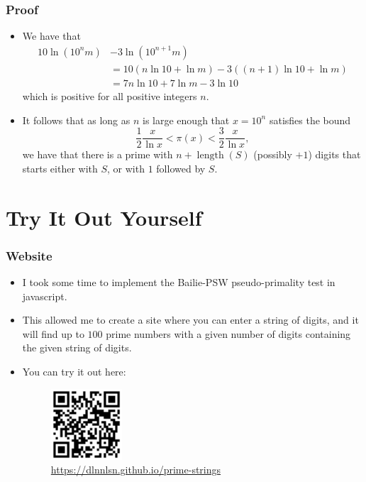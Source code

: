 \documentclass{beamer}
\begin{document}
\begin{frame}
    \frametitle{Proof}

    \begin{itemize}
        \item We have that
        \begin{align*}
            10 \ln\left( 10^n m \right) & - 3 \ln\left( 10^{n + 1} m \right) \\
            & = 10\left( n \ln 10 + \ln m \right) - 3\left( (n + 1) \ln 10  + \ln m \right) \\
            & = 7n \ln 10 + 7 \ln m - 3 \ln 10
        \end{align*}
        which is positive for all positive integers $n$. \pause
        \item It follows that as long as $n$ is large enough that $x = 10^n$ satisfies the bound
        \[
            \frac{1}{2} \frac{x}{\ln x} < \pi(x) < \frac{3}{2} \frac{x}{\ln x},
        \]
        we have that there is a prime with $n + \operatorname{length}(S)$ (possibly $+ 1$) digits that starts either with $S$, or with $1$ followed by $S$.
    \end{itemize} 

\end{frame}

\section{Try It Out Yourself}

\begin{frame}
    \frametitle{Website}

    \begin{itemize}
        \item I took some time to implement the Bailie-PSW pseudo-primality test in javascript. \pause
        \item This allowed me to create a site where you can enter a string of digits, and it will find up to $100$ prime numbers with a given number of digits containing the given string of digits. \pause
        \item You can try it out here:
        \begin{figure}
            \centering
            \includegraphics[width=0.25\textwidth]{prime_strings.png}
            \caption{\url{https://dlnnlsn.github.io/prime-strings}}
        \end{figure}
    \end{itemize} 

\end{frame}
\end{document}

